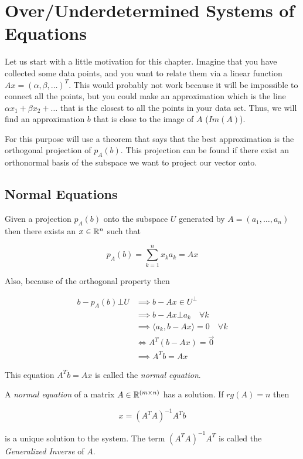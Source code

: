 \newpage
\section{Over/Underdetermined Systems of Equations}

Let us start with a little motivation for this chapter. Imagine that you have collected some data points, 
and you want to relate them via a linear function \(Ax = (\alpha, \beta, \dots)^T\). This would probably 
not work because it will be impossible to connect all the points, but you could make an approximation 
which is the line \(\alpha x_1 + \beta x_2 + \dots\) that is the closest to all the points in your data 
set. Thus, we will find an approximation 
\(b\) that is close to the image of \(A\) (\(Im(A)\)).

For this purpose will use a theorem that says that the best approximation is the orthogonal projection of 
\(p_A (b)\). This projection can be found if there exist an orthonormal basis of the subspace we want to 
project our vector onto.

\subsection{Normal Equations}

Given a projection \(p_A (b)\) onto the subspace \(U\) generated by \(A = (a_1, \dots, a_n)\) then there 
exists an \(x \in \mathbb{R}^n\) such that 

\[
	p_{A}(b) = \sum_{k = 1}^{n} x_k a_k = Ax
\]

Also, because of the orthogonal property then

\begin{align*}
	b - p_{A}(b) \bot U &\implies b - Ax  \in U^{\bot}\\
						&\implies b - Ax \bot a_k \quad \forall k\\
						&\implies \langle a_k, b - Ax \rangle = 0 \quad \forall k\\
						&\iff A^{T} (b - Ax) = \vec{0}\\
						&\implies A^{T}b = Ax 
\end{align*}

This equation \(A^{T}b = Ax\) is called the \emph{normal equation}.

A \emph{normal equation} of a matrix \(A \in \mathbb{R}^{(m \times n)}\) has a solution. 
If \(rg(A) = n\) then 

\[
	x = {(A^T A)}^{-1} A^T b
\]

is a unique solution to the system. The term \({(A^T A)}^{-1}A^T\) is called the 
\emph{Generalized Inverse} of \(A\).

